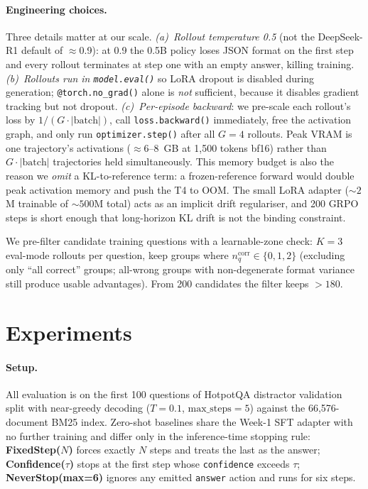 \documentclass[11pt]{article}
\begin{document}
\paragraph{Engineering choices.}
Three details matter at our scale. \emph{(a)~Rollout temperature
0.5} (not the DeepSeek-R1 default of $\approx$0.9): at 0.9 the
0.5B policy loses JSON format on the first step and every rollout
terminates at step one with an empty answer, killing training.
\emph{(b)~Rollouts run in \texttt{model.eval()}} so LoRA dropout
is disabled during generation;
\texttt{@torch.no\_grad()} alone is \emph{not} sufficient, because
it disables gradient tracking but not dropout. \emph{(c)~Per-episode
backward}: we pre-scale each rollout's loss by $1/(G\cdot|\text{batch}|)$,
call \texttt{loss.backward()} immediately, free the activation
graph, and only run \texttt{optimizer.step()} after all
$G{=}4$ rollouts. Peak VRAM is one trajectory's activations
($\approx$6--8~GB at 1{,}500 tokens bf16) rather than
$G{\cdot}|\text{batch}|$ trajectories held simultaneously. This
memory budget is also the reason we \emph{omit} a KL-to-reference
term: a frozen-reference forward would double peak activation
memory and push the T4 to OOM. The small LoRA adapter
(${\sim}2$M trainable of ${\sim}500$M total) acts as an implicit
drift regulariser, and 200 GRPO steps is short enough that
long-horizon KL drift is not the binding constraint.

We pre-filter candidate training questions with a learnable-zone
check: $K{=}3$ eval-mode rollouts per question, keep groups where
$n^{\mathrm{corr}}_q \in \{0,1,2\}$ (excluding only ``all correct''
groups; all-wrong groups with non-degenerate format variance still
produce usable advantages). From 200 candidates the filter keeps
${>}180$.

\section{Experiments}
\label{sec:experiments}

\paragraph{Setup.}
All evaluation is on the first 100 questions of HotpotQA distractor
validation split with near-greedy decoding ($T{=}0.1$,
$\mathrm{max\_steps}{=}5$) against the 66{,}576-document BM25 index.
Zero-shot baselines share the Week-1 SFT adapter with no further
training and differ only in the inference-time stopping rule:
\textbf{FixedStep($N$)} forces exactly $N$ steps and treats the
last as the answer; \textbf{Confidence($\tau$)} stops at the first
step whose \texttt{confidence} exceeds $\tau$;
\textbf{NeverStop(max=6)} ignores any emitted \texttt{answer}
action and runs for six steps.
\end{document}
